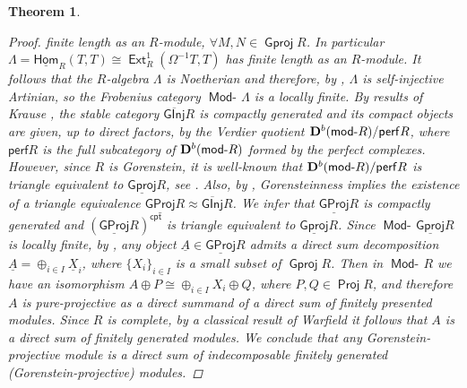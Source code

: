 \documentclass[oneside, a4paper,reqno]{amsart}
\numberwithin{equation}{section}
\newtheorem{thm}{Theorem}[section]
\theoremstyle{definition}
\begin{document}
\begin{thm}
\begin{proof}
finite length as an $R$-module, $\forall M,N \in {\operatorname{\mathsf{Gproj}}\nolimits} R$. In
particular $\Lambda = \operatorname*{\underline{\mathsf{Hom}}}_{R}(T,T) \cong
\operatorname*{\mathsf{Ext}}^{1}_{R}(\Omega^{-1}T,T)$ has finite length as an $R$-module. It
follows that the $R$-algebra $\Lambda$ is Noetherian and therefore,
by \cite{Buchweitz}, $\Lambda$ is self-injective Artinian, so the
Frobenius category $\operatorname*{\mathsf{Mod}-\!}\Lambda$ is a locally finite. By results of
Krause \cite{Krause:stable}, the stable category ${\operatorname{\overline{\mathsf{GInj}}}\nolimits} R$ is
compactly generated and its compact objects are given, up to direct
factors, by the Verdier quotient ${\bf D}^{b}(\operatorname*{\mathsf{mod}-\!}
R)/\mathsf{perf}R$, where $\mathsf{perf}R$ is the full subcategory
of ${\bf D}^{b}(\operatorname*{\mathsf{mod}-\!} R)$ formed by the perfect complexes. However,
since $R$ is Gorenstein, it is well-known that ${\bf D}^{b}(\operatorname*{\mathsf{mod}-\!}
R)/\mathsf{perf}R$ is triangle equivalent to  ${\operatorname{\underline{\mathsf{Gproj}}}\nolimits} R$, see
\cite{Buchweitz}. Also, by \cite[Theorem VI.3.2]{BR}, Gorensteinness
implies the existence of a triangle equivalence ${\operatorname{\underline{\mathsf{GProj}}}\nolimits} R \approx
{\operatorname{\overline{\mathsf{GInj}}}\nolimits} R$. We infer that ${\operatorname{\underline{\mathsf{GProj}}}\nolimits} R$ is compactly generated and
$({\operatorname{\underline{\mathsf{GProj}}}\nolimits} R)^{\mathsf{cpt}}$ is triangle equivalent to ${\operatorname{\underline{\mathsf{Gproj}}}\nolimits} R$. Since
$\operatorname*{\mathsf{Mod}-\!}{\operatorname{\underline{\mathsf{Gproj}}}\nolimits} R$ is locally finite, by \cite[Theorem 9.3]{B:3cats},
any object ${\underline A} \in {\operatorname{\underline{\mathsf{GProj}}}\nolimits} R$ admits a direct sum decomposition
${\underline A} = \oplus_{i\in I}{\underline X}_{i}$, where $\{X_{i}\}_{i\in I}$ is a
small subset of ${\operatorname{\mathsf{Gproj}}\nolimits} R$. Then in $\operatorname*{\mathsf{Mod}-\!} R$ we have an isomorphism
$A \oplus P \cong \oplus_{i\in I}X_{i} \oplus Q$, where $P, Q \in
\operatorname*{\mathsf{Proj}} R$, and therefore  $A$ is pure-projective as a direct summand
of a direct sum of finitely presented modules.  Since $R$ is
complete, by a classical result of Warfield \cite[Corollary
4]{Warfield} it follows that $A$ is a direct sum of finitely
generated modules. We conclude that any Gorenstein-projective module
is a direct sum of indecomposable finitely generated
(Gorenstein-projective) modules.


\end{proof}
\end{thm}
\end{document}
